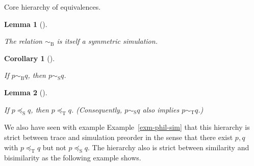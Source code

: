 \documentclass[
  a4paper,
]{report}
\theoremstyle{plain}
\theoremstyle{plain}
\newtheorem{corollary}{Corollary}[section]
\theoremstyle{definition}
\theoremstyle{plain}
\newtheorem{lemma}{Lemma}[section]
\theoremstyle{definition}
\theoremstyle{remark}
\begin{document}
\begin{marginfigure}


\caption{\label{fig-core-hierarchy}Core hierarchy of equivalences.}

\end{marginfigure}%

\begin{lemma}[]\protect\hypertarget{lem-bisim-bisim}{}\label{lem-bisim-bisim}

The relation \(\sim_\mathrm{B}\) is itself a symmetric simulation.

\end{lemma}

\begin{corollary}[]\protect\hypertarget{cor-bisim-impl-sim}{}\label{cor-bisim-impl-sim}

If \(p \sim_\mathrm{B} q\), then \(p \sim_\mathrm{S} q\).

\end{corollary}

\begin{lemma}[]\protect\hypertarget{lem-sim-impl-traces}{}\label{lem-sim-impl-traces}

If \(p \preceq_\mathrm{S} q\), then \(p \preceq_\mathrm{T} q\).
(Consequently, \(p \sim_\mathrm{S} q\) also implies
\(p \sim_\mathrm{T} q\).)

\end{lemma}

\noindent  We also have seen with example Example~\ref{exm-phil-sim}
that this hierarchy is strict between trace and simulation preorder in
the sense that there exist \(p,q\) with \(p \preceq_\mathrm{T} q\) but
not \(p \preceq_\mathrm{S} q\). The hierarchy also is strict between
similarity and bisimilarity as the following example shows.
\end{document}
